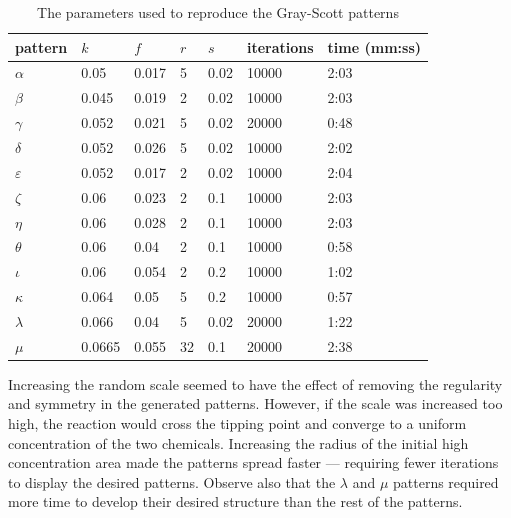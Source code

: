 \begin{table}[H]
    \centering
    \caption{The parameters used to reproduce the Gray-Scott patterns}\label{prob5:tab:parameters}
    \begin{tabular}{@{}lllllll@{}}
        \toprule
        pattern       & $k$    & $f$   & $r$ & $s$  & iterations & time (mm:ss) \\ \midrule
        $\alpha$      & 0.05   & 0.017 & 5   & 0.02 & 10000      & 2:03         \\
        $\beta$       & 0.045  & 0.019 & 2   & 0.02 & 10000      & 2:03         \\
        $\gamma$      & 0.052  & 0.021 & 5   & 0.02 & 20000      & 0:48         \\
        $\delta$      & 0.052  & 0.026 & 5   & 0.02 & 10000      & 2:02         \\
        $\varepsilon$ & 0.052  & 0.017 & 2   & 0.02 & 10000      & 2:04         \\
        $\zeta$       & 0.06   & 0.023 & 2   & 0.1  & 10000      & 2:03         \\
        $\eta$        & 0.06   & 0.028 & 2   & 0.1  & 10000      & 2:03         \\
        $\theta$      & 0.06   & 0.04  & 2   & 0.1  & 10000      & 0:58         \\
        $\iota$       & 0.06   & 0.054 & 2   & 0.2  & 10000      & 1:02         \\
        $\kappa$      & 0.064  & 0.05  & 5   & 0.2  & 10000      & 0:57         \\
        $\lambda$     & 0.066  & 0.04  & 5   & 0.02 & 20000      & 1:22         \\
        $\mu$         & 0.0665 & 0.055 & 32  & 0.1  & 20000      & 2:38         \\ \bottomrule
    \end{tabular}
\end{table}

Increasing the random scale seemed to have the effect of removing the regularity and symmetry in the generated patterns.
However, if the scale was increased too high, the reaction would cross the tipping point and converge to a uniform concentration of the two chemicals.
Increasing the radius of the initial high concentration area made the patterns spread faster --- requiring fewer iterations to display the desired patterns.
Observe also that the $\lambda$ and $\mu$ patterns required more time to develop their desired structure than the rest of the patterns.

